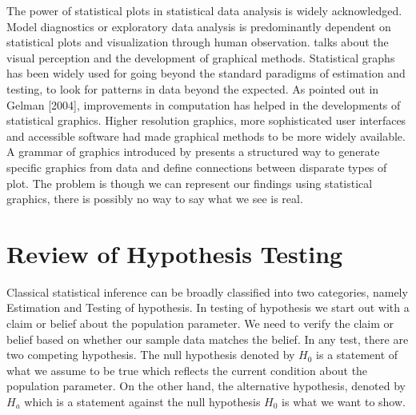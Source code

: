 \documentclass[12]{report}
\begin{document}
The power of statistical plots in statistical data analysis is widely acknowledged. Model diagnostics or exploratory data analysis is predominantly dependent on statistical plots and visualization through human observation. \cite{cleveland:1984} talks about the visual perception and the development of graphical methods. Statistical graphs has been widely used for going beyond the standard paradigms of estimation and testing, to look for patterns in data beyond the expected. As pointed out in Gelman [2004], improvements in computation has helped in the developments of statistical graphics. Higher resolution graphics, more sophisticated user interfaces and accessible software had made graphical methods to be more widely available. A grammar of graphics introduced by \cite{wilkinson:1999} presents a structured way to generate specific graphics from data and define connections between disparate types of plot. The problem is though we can represent our findings using statistical graphics, there is possibly no way to say what we see is real. 


%


\section{Review of Hypothesis Testing}

Classical statistical inference can be broadly classified into two categories, namely Estimation and Testing of hypothesis. In testing of hypothesis we start out with a claim or belief about the population parameter. We need to verify the claim or belief based on whether our sample data matches the belief. In any test, there are two competing hypothesis. The null hypothesis denoted by $H_0$ is a statement of what we assume to be true which reflects the current condition about the population parameter. On the other hand, the alternative hypothesis, denoted by $H_a$ which is a statement against the null hypothesis $H_0$ is what we want to show. 
\end{document}
